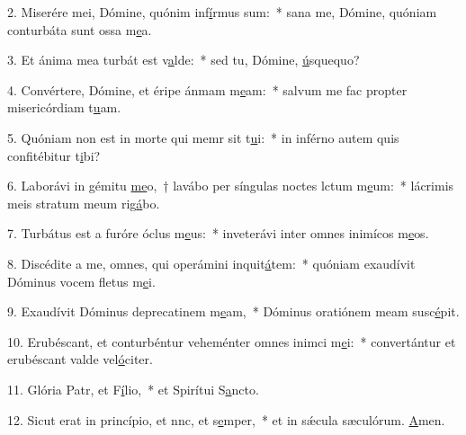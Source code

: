 2. Miserére mei, Dómine, quónim inf\uline{í}rmus sum:~* sana me, Dómine, quóniam conturbáta sunt ossa m\uline{e}a.\par 
3. Et ánima mea turbát est v\uline{a}lde:~* sed tu, Dómine, \uline{ú}squequo?\par 
4. Convértere, Dómine, et éripe ánmam m\uline{e}am:~* salvum me fac propter misericórdiam t\uline{u}am.\par 
5. Quóniam non est in morte qui memr sit t\uline{u}i:~* in inférno autem quis confitébitur t\uline{i}bi?\par 
6. Laborávi in gémitu \uline{me}o,~† lavábo per síngulas noctes lctum m\uline{e}um:~* lácrimis meis stratum meum rig\uline{á}bo.\par 
7. Turbátus est a furóre óclus m\uline{e}us:~* inveterávi inter omnes inimícos m\uline{e}os.\par 
8. Discédite a me, omnes, qui operámini inquit\uline{á}tem:~* quóniam exaudívit Dóminus vocem fletus m\uline{e}i.\par 
9. Exaudívit Dóminus deprecatinem m\uline{e}am,~* Dóminus oratiónem meam susc\uline{é}pit.\par 
10. Erubéscant, et conturbéntur veheménter omnes inimci m\uline{e}i:~* convertántur et erubéscant valde vel\uline{ó}citer.\par 
11. Glória Patr, et F\uline{í}lio,~* et Spirítui S\uline{a}ncto.\par 
12. Sicut erat in princípio, et nnc, et s\uline{e}mper,~* et in sǽcula sæculórum. \uline{A}men.\par 
